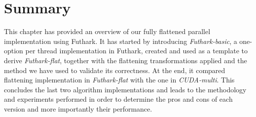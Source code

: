\section*{Summary}
This chapter has provided an overview of our fully flattened parallel implementation using Futhark. It has started by introducing \textit{Futhark-basic}, a one-option per thread implementation in Futhark, created and used as a template to derive \textit{Futhark-flat}, together with the flattening transformations applied and the method we have used to validate its correctness. At the end, it compared flattening implementation in \textit{Futhark-flat} with the one in \textit{CUDA-multi}. This concludes the last two algorithm implementations and leads to the methodology and experiments performed in order to determine the pros and cons of each version and more importantly their performance.  


